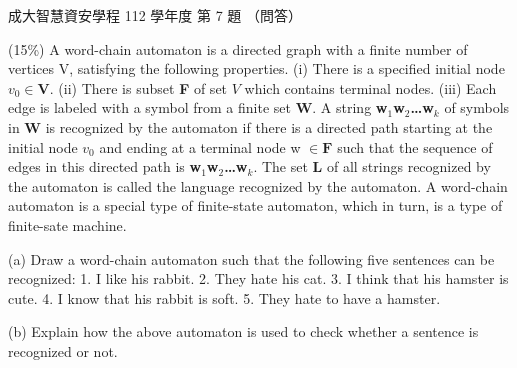 \begin{pastexam}[label={px:ncku-112-isec-ds-07}]{成大智慧資安學程 112 學年度 第 7 題}
（問答）

(15\%) A word-chain automaton is a directed graph with a finite number of vertices V, satisfying the
following properties. (i) There is a specified initial node $v_0\in \boldsymbol{V}$. (ii) There is
subset \textbf{F} of set $V$ which contains terminal nodes. (iii) Each edge is labeled with a symbol
from a finite set \textbf{W}. A string \textbf{w$_1$w$_2$\ldots w$_k$} of symbols in \textbf{W} is
recognized by the automaton if there is a directed path starting at the initial node $v_0$ and
ending at a terminal node w $\in \boldsymbol{F}$ such that the sequence of edges in this directed
path is \textbf{w$_1$w$_2$\ldots w$_k$}. The set \textbf{L} of all strings recognized by the
automaton is called the language recognized by the automaton. A word-chain automaton is a special
type of finite-state automaton, which in turn, is a type of finite-sate machine.

(a) Draw a word-chain automaton such that the following five sentences can be recognized: 1. I like
his rabbit. 2. They hate his cat. 3. I think that his hamster is cute. 4. I know that his rabbit
is soft. 5. They hate to have a hamster.

(b) Explain how the above automaton is used to check whether a sentence is recognized or not.
\end{pastexam}

